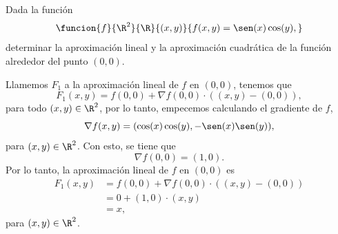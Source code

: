 \documentclass[a4,11pt]{aleph-examen}
\begin{document}
\begin{preguntas}
\begin{respuesta}
\begin{respuesta}
\item  
    Dada la función
    \[
        \funcion{f}{\R^2}{\R}{(x,y)}{f(x,y)=\sen(x)\cos(y),}
    \]
    determinar la aproximación lineal y la aproximación cuadrática de la función alrededor del punto $(0,0)$.

\begin{respuesta}
    Llamemos $F_1$ a la aproximación lineal de $f$ en $(0,0)$, tenemos que
    \[
        F_1(x,y) = f(0,0) + \nabla f(0,0) \cdot ((x,y)-(0,0)),
    \]
    para todo $(x,y)\in\R ^2$, por lo tanto, empecemos calculando el gradiente de $f$,
    \[
        \nabla f(x,y) = (\cos(x) \cos(y), -\sen(x) \sen(y) ),
    \]
    para $(x,y)\in\R^2$. Con esto, se tiene que
    \[
        \nabla f(0,0) = (1,0).
    \]
    Por lo tanto, la aproximación lineal de $f$ en $(0,0)$ es
    \begin{align*}
        F_1(x,y)
            & = f(0,0) + \nabla f(0,0) \cdot ((x,y)-(0,0))\\
            & = 0 + (1,0)\cdot (x,y)\\
            & = x,
    \end{align*}
    para $(x,y)\in\R^2$.
    

\end{respuesta}
\end{respuesta}
\end{respuesta}
\end{preguntas}
\end{document}
